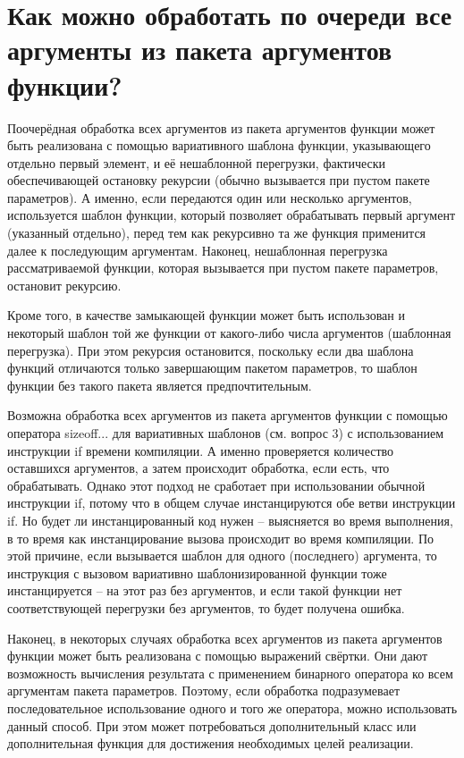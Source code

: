 \documentclass[a4paper,12pt]{article}	%
\begin{document}
\newpage

\section{Как можно обработать по очереди все аргументы из пакета аргументов функции?}

	Поочерёдная обработка всех аргументов из пакета аргументов функции может быть реализована с помощью вариативного шаблона функции, указывающего отдельно первый элемент, и её нешаблонной перегрузки, фактически обеспечивающей остановку рекурсии (обычно вызывается при пустом пакете параметров). А именно, если передаются один или несколько аргументов, используется шаблон функции, который позволяет обрабатывать первый аргумент (указанный отдельно), перед тем как рекурсивно та же функция применится далее к последующим аргументам. Наконец, нешаблонная перегрузка рассматриваемой функции, которая вызывается при пустом пакете параметров, остановит рекурсию.
	
	Кроме того, в качестве замыкающей функции может быть использован и некоторый шаблон той же функции от какого-либо числа аргументов (шаблонная перегрузка). При этом рекурсия остановится, поскольку если два шаблона функций отличаются только завершающим пакетом параметров, то шаблон функции без такого пакета является предпочтительным.
	
	Возможна обработка всех аргументов из пакета аргументов функции с помощью оператора sizeoff... для вариативных шаблонов (см. вопрос 3) с использованием инструкции if времени компиляции. А именно проверяется количество оставшихся аргументов, а затем происходит обработка, если есть, что обрабатывать. Однако этот подход не сработает при использовании обычной инструкции if, потому что в общем случае инстанцируются обе ветви инструкции if. Но будет ли инстанцированный код нужен -- выясняется во время выполнения, в то время как инстанцирование вызова происходит во время компиляции. По этой причине, если вызывается шаблон для одного (последнего) аргумента, то инструкция с вызовом вариативно шаблонизированной функции тоже инстанцируется -- на этот раз без аргументов, и если такой функции нет соответствующей перегрузки без аргументов, то будет получена ошибка.

	Наконец, в некоторых случаях обработка всех аргументов из пакета аргументов функции может быть реализована с помощью выражений свёртки. Они дают возможность вычисления результата с применением бинарного оператора ко всем аргументам пакета параметров. Поэтому, если обработка подразумевает последовательное использование одного и того же оператора, можно использовать данный способ. При этом может потребоваться дополнительный класс или дополнительная функция для достижения необходимых целей реализации.
	
\end{document}
